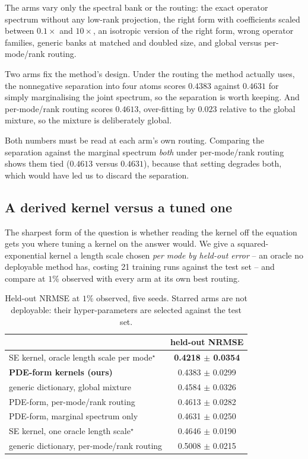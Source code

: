 The arms vary only the spectral bank or the routing: the exact operator spectrum
without any low-rank projection, the right form with coefficients scaled between
$0.1\times$ and $10\times$, an isotropic version of the right form, wrong operator
families, generic banks at matched and doubled size, and global versus
per-mode/rank routing.

Two arms fix the method's design.  Under the routing the method actually uses,
the nonnegative separation into four atoms scores $0.4383$ against $0.4631$ for
simply marginalising the joint spectrum, so the separation is worth keeping.  And
per-mode/rank routing scores $0.4613$, over-fitting by $0.023$ relative to the
global mixture, so the mixture is deliberately global.

Both numbers must be read at each arm's own routing.  Comparing the separation
against the marginal spectrum \emph{both} under per-mode/rank routing shows them
tied ($0.4613$ versus $0.4631$), because that setting degrades both, which would
have led us to discard the separation.

\subsection{A derived kernel versus a tuned one}
The sharpest form of the question is whether reading the kernel off the equation
gets you where tuning a kernel on the answer would.  We give a squared-exponential
kernel a length scale chosen \emph{per mode by held-out error} -- an oracle no
deployable method has, costing 21 training runs against the test set -- and
compare at $1\%$ observed with every arm at its own best routing.

\begin{table}[t]
  \centering
  \caption{Held-out NRMSE at $1\%$ observed, five seeds.  Starred arms are not
  deployable: their hyper-parameters are selected against the test set.}
  \label{tab:oracle}
  \small
  \begin{tabular}{lc}
    \toprule
    & held-out NRMSE \\
    \midrule
    SE kernel, oracle length scale per mode$^\star$ & \textbf{0.4218 $\pm$ 0.0354} \\
    \textbf{PDE-form kernels (ours)}               & 0.4383 $\pm$ 0.0299 \\
    generic dictionary, global mixture              & 0.4584 $\pm$ 0.0326 \\
    PDE-form, per-mode/rank routing                 & 0.4613 $\pm$ 0.0282 \\
    PDE-form, marginal spectrum only                & 0.4631 $\pm$ 0.0250 \\
    SE kernel, one oracle length scale$^\star$      & 0.4646 $\pm$ 0.0190 \\
    generic dictionary, per-mode/rank routing       & 0.5008 $\pm$ 0.0215 \\
    \bottomrule
  \end{tabular}
\end{table}

